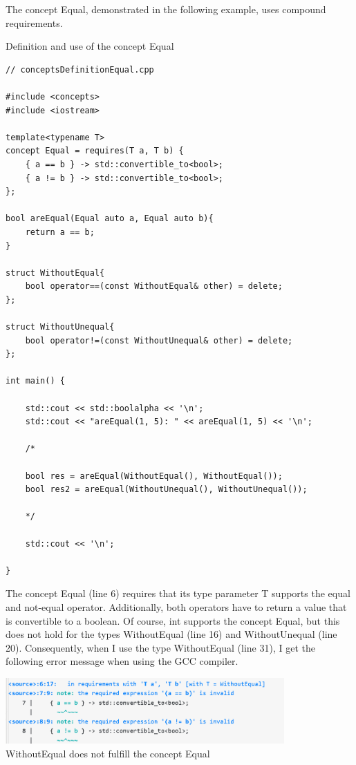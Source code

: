 The concept Equal, demonstrated in the following example, uses compound requirements.

\noindent
Definition and use of the concept Equal
\begin{lstlisting}[style=styleCXX]
// conceptsDefinitionEqual.cpp

#include <concepts>
#include <iostream>

template<typename T>
concept Equal = requires(T a, T b) {
	{ a == b } -> std::convertible_to<bool>;
	{ a != b } -> std::convertible_to<bool>;
};

bool areEqual(Equal auto a, Equal auto b){
	return a == b;
}

struct WithoutEqual{
	bool operator==(const WithoutEqual& other) = delete;
};

struct WithoutUnequal{
	bool operator!=(const WithoutUnequal& other) = delete;
};

int main() {

	std::cout << std::boolalpha << '\n';
	std::cout << "areEqual(1, 5): " << areEqual(1, 5) << '\n';
	
	/*
	
	bool res = areEqual(WithoutEqual(), WithoutEqual());
	bool res2 = areEqual(WithoutUnequal(), WithoutUnequal());
	
	*/
	
	std::cout << '\n';

}
\end{lstlisting}

The concept Equal (line 6) requires that its type parameter T supports the equal and not-equal operator. Additionally, both operators have to return a value that is convertible to a boolean. Of course, int supports the concept Equal, but this does not hold for the types WithoutEqual (line 16) and WithoutUnequal (line 20). Consequently, when I use the type WithoutEqual (line 31), I get the following error message when using the GCC compiler.

\begin{center}
\includegraphics[width=0.8\textwidth]{content/3/chapter4/images/1-4.png}\\
WithoutEqual does not fulfill the concept Equal
\end{center}

